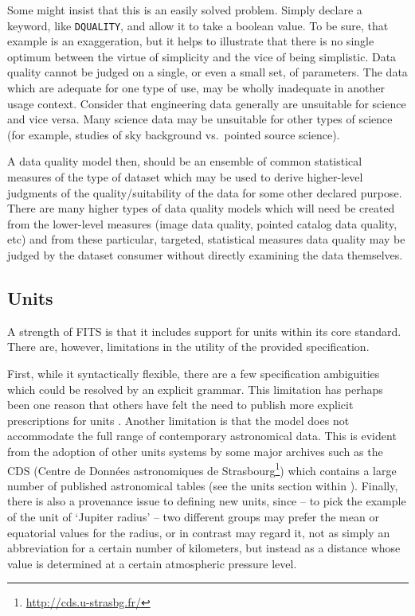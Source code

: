 \documentclass[final,authoryear,5p,times,twocolumn]{elsarticle}
\begin{document}
{{Some might insist that this is an easily solved problem. Simply
declare a keyword, like \texttt{DQUALITY}, and allow it to take a boolean
value. To be sure, that example is an exaggeration, but it helps to
illustrate that there is no single optimum between the virtue of
simplicity and the vice of being simplistic.
Data quality cannot be judged on a single, or even a
small set, of parameters. The
data which are adequate for one type of use, may be wholly inadequate
in another usage context. Consider that engineering data generally are
unsuitable for science and vice versa. Many science data may be
unsuitable for other types of science (for example, studies of sky
background vs.\ pointed source science).


A data quality model then, should be an ensemble of common statistical
measures of the type of dataset which may be used to derive
higher-level judgments of the quality/suitability of the data for
some other declared purpose. There are many higher types of data
quality models which will need be created from the lower-level
measures (image data quality, pointed catalog data quality, etc) and
from these particular, targeted, statistical measures data quality may
be judged by the dataset consumer without directly examining the data
themselves.


\subsection{Units}
\label{sec_units}

A strength of FITS is that it includes support for units within its core
standard. There are, however, limitations in the utility of the provided
specification.

First, while it syntactically flexible, there are a few
specification ambiguities which could be resolved by an explicit grammar.  
This limitation has perhaps been one reason that others
have felt the need to publish more explicit prescriptions for units
\citep{1995OGIPUnits}.  Another limitation is that the model does   
not accommodate the full range of contemporary astronomical data. This
is evident from the adoption of other units systems by some major
archives such as the CDS (Centre de Donn\'ees astronomiques de Strasbourg\footnote{\url{http://cds.u-strasbg.fr/}}) which contains a large number of published 
astronomical tables (see the units section within \citealt{2000CDSUnits}).  
Finally, there is also a provenance issue to defining new units, since 
-- to pick the example of
the unit of `Jupiter radius' -- two different groups may prefer the
mean or equatorial values for the radius, or in contrast may regard it,
not as simply an abbreviation for a certain number of
kilometers, but instead as a distance whose value is determined at a
certain atmospheric pressure level.

}}
\end{document}
